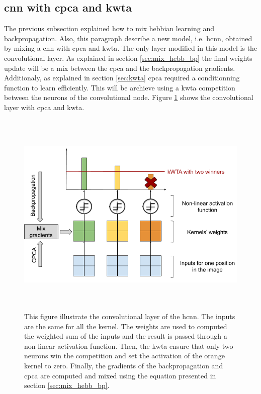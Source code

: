 \documentclass[11pt]{report}
\begin{document}
\subsection{\acrshort{cnn} with \acrshort{cpca} and \acrshort{kwta}}
The previous subsection explained how to mix hebbian learning and backpropagation. Also, this paragraph describe a new model, i.e. \acrshort{hcnn}, obtained by mixing a \acrshort{cnn} with \acrshort{cpca} and \acrshort{kwta}. The only layer modified in this model is the convolutional layer. As explained in section \ref{sec:mix_hebb_bp} the final weights update will be a mix between the \acrshort{cpca} and the backpropagation gradients. Additionaly, as explained in section \ref{sec:kwta} \acrshort{cpca} required a conditionning function to learn efficiently. This will be archieve using a \acrshort{kwta} competition between the neurons of the convolutional node. Figure \ref{fig:hcnn} shows the convolutional layer with \acrshort{cpca} and \acrshort{kwta}.

\begin{figure}[h]
\centering
\includegraphics[width=15cm, height=10cm]{hcnn}
\caption[Illustration of the \acrlong{hcnn}]{This figure illustrate the convolutional layer of the \acrlong{hcnn}. The inputs are the same for all the kernel. The weights are used to computed the weighted sum of the inputs and the result is passed through a non-linear activation function. Then, the \acrshort{kwta} ensure that only two neurons win the competition and set the activation of the orange kernel to zero. Finally, the gradients of the backpropagation and \acrshort{cpca} are computed and mixed using the equation presented in section \ref{sec:mix_hebb_bp}.}
\label{fig:hcnn}
\end{figure}
\end{document}
